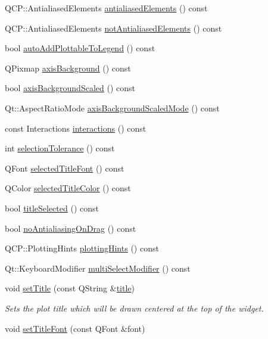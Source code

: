 \begin{DoxyCompactItemize}
Q\+C\+P\+::\+Antialiased\+Elements \hyperlink{a00116_acc24388098ddb95f5a651cede3f34b99}{antialiased\+Elements} () const 
\item 
Q\+C\+P\+::\+Antialiased\+Elements \hyperlink{a00116_ad611ed86732d07774545f5bd4b7f18b7}{not\+Antialiased\+Elements} () const 
\item 
bool \hyperlink{a00116_a6f69c94a93cc891c949b3e751c720f5e}{auto\+Add\+Plottable\+To\+Legend} () const 
\item 
Q\+Pixmap \hyperlink{a00116_af825b034d19796fae7037a94a9fbccf6}{axis\+Background} () const 
\item 
bool \hyperlink{a00116_ac2f10596a500c25a071a36475fe47253}{axis\+Background\+Scaled} () const 
\item 
Qt\+::\+Aspect\+Ratio\+Mode \hyperlink{a00116_ab31c417b87bcdbb9e04b0505465fe5ce}{axis\+Background\+Scaled\+Mode} () const 
\item 
const Interactions \hyperlink{a00116_aa9966a7b4022af4909a34d9a31f6b229}{interactions} () const 
\item 
int \hyperlink{a00116_af22c796c7588a9b2cee72006df110c37}{selection\+Tolerance} () const 
\item 
Q\+Font \hyperlink{a00116_a07c280a4d8a83687ac418f8988ad6c93}{selected\+Title\+Font} () const 
\item 
Q\+Color \hyperlink{a00116_a1b7e34bdeae046a4ddb41b20fa8cd853}{selected\+Title\+Color} () const 
\item 
bool \hyperlink{a00116_a23f3f4b312d1d78837f2a3602792d8e3}{title\+Selected} () const 
\item 
bool \hyperlink{a00116_afbdf6face9c69192ce86afdf09f0efcc}{no\+Antialiasing\+On\+Drag} () const 
\item 
Q\+C\+P\+::\+Plotting\+Hints \hyperlink{a00116_a9ba08fdbd9e3fb0a2a4ae2f6af8ed2d0}{plotting\+Hints} () const 
\item 
Qt\+::\+Keyboard\+Modifier \hyperlink{a00116_ae485cc59426cf41f3fa2df4b92dc1e54}{multi\+Select\+Modifier} () const 
\item 
void \hyperlink{a00116_a84257c1e1f984b3932245069428f3176}{set\+Title} (const Q\+String \&\hyperlink{a00116_aec7f0fb0be1d3a0a946f0ded3a860d20}{title})
\begin{DoxyCompactList}\small\item\em Sets the plot title which will be drawn centered at the top of the widget. \end{DoxyCompactList}\item 
void \hyperlink{a00116_ae104d89b683a6ec6831c4b7b02530f15}{set\+Title\+Font} (const Q\+Font \&font)

\end{DoxyCompactItemize}
